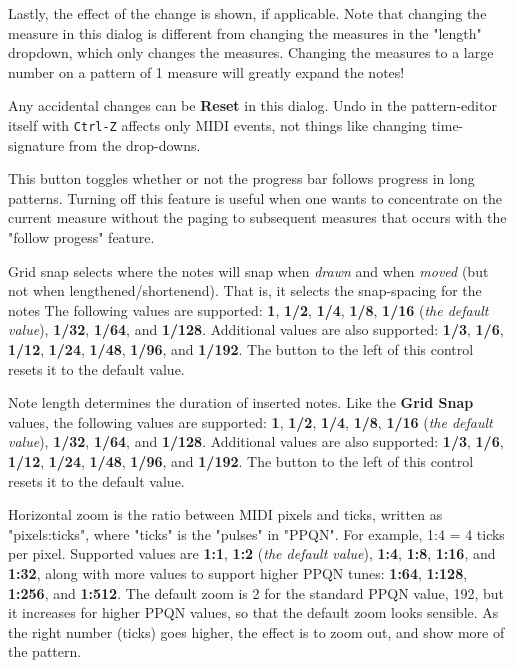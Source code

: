    Lastly, the effect of the change is shown, if applicable.
   Note that changing the measure in this dialog is different from
   changing the measures in the "length" dropdown, which only changes the
   measures.
   Changing the measures to a large number on a pattern of 1 measure will
   greatly expand the notes!

   Any accidental changes can be \textbf{Reset}
   in this dialog.
   Undo in the pattern-editor itself with \texttt{Ctrl-Z} affects
   only MIDI events, not things like changing time-signature from the
   drop-downs.

   This button toggles whether or not the progress bar follows
   progress in long patterns.  Turning off this feature is useful when
   one wants to concentrate on the current measure without the paging to
   subsequent measures that occurs with the "follow progess" feature.

   Grid snap selects where the notes will snap when
   \textsl{drawn} and when \textsl{moved} (but not when lengthened/shortenend).
   That is, it selects the snap-spacing for the notes
   The following values are supported:
   \textbf{1}, \textbf{1/2}, \textbf{1/4}, \textbf{1/8},
   \textbf{1/16} (\textsl{the default value}),
   \textbf{1/32}, \textbf{1/64}, and \textbf{1/128}.
   Additional values are also supported:
   \textbf{1/3}, \textbf{1/6}, \textbf{1/12}, \textbf{1/24},
   \textbf{1/48}, \textbf{1/96}, and \textbf{1/192}.
   The button to the left of this control resets it to the default value.

   Note length determines the duration of inserted notes.
   Like the \textbf{Grid Snap} values,
   the following values are supported:
   \textbf{1}, \textbf{1/2}, \textbf{1/4}, \textbf{1/8},
   \textbf{1/16} (\textsl{the default value}),
   \textbf{1/32}, \textbf{1/64}, and \textbf{1/128}.
   Additional values are also supported:
   \textbf{1/3}, \textbf{1/6}, \textbf{1/12}, \textbf{1/24},
   \textbf{1/48}, \textbf{1/96}, and \textbf{1/192}.
   The button to the left of this control resets it to the default value.

   Horizontal zoom is the ratio between MIDI pixels and ticks, written as
   "pixels:ticks", where "ticks" is the "pulses" in "PPQN".
   For example, 1:4 = 4 ticks per pixel.
   Supported values are
   \textbf{1:1}, \textbf{1:2} (\textsl{the default value}),
   \textbf{1:4}, \textbf{1:8}, \textbf{1:16},
   and \textbf{1:32}, along with
   more values to support higher PPQN tunes:
   \textbf{1:64}, \textbf{1:128}, \textbf{1:256}, and \textbf{1:512}.
   The default zoom is 2 for the standard PPQN value, 192, but it
   increases for higher PPQN values, so that the default zoom looks sensible.
   As the right number (ticks) goes higher,
   the effect is to zoom out, and show more of the pattern.

